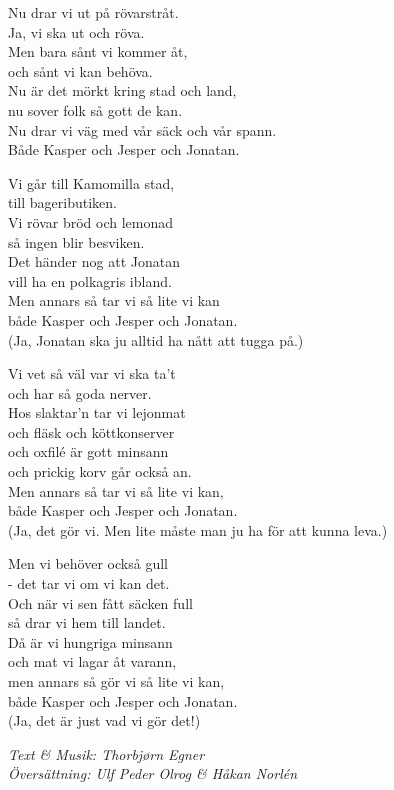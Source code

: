 \vspace{10pt}
Nu drar vi ut på rövarstråt.\\
Ja, vi ska ut och röva.\\
Men bara sånt vi kommer åt,\\
och sånt vi kan behöva.\\
Nu är det mörkt kring stad och land,\\
nu sover folk så gott de kan.\\
Nu drar vi väg med vår säck och vår spann.\\
Både Kasper och Jesper och Jonatan.\par
\vspace{10pt}
Vi går till Kamomilla stad,\\
till bageributiken.\\
Vi rövar bröd och lemonad\\
så ingen blir besviken.\\
Det händer nog att Jonatan\\
vill ha en polkagris ibland.\\
Men annars så tar vi så lite vi kan\\
både Kasper och Jesper och Jonatan.\\
{\footnotesize(Ja, Jonatan ska ju alltid ha nått att tugga på.)}\par
\vspace{10pt}
Vi vet så väl var vi ska ta't\\
och har så goda nerver.\\
Hos slaktar'n tar vi lejonmat\\
och fläsk och köttkonserver\\
och oxfilé är gott minsann\\
och prickig korv går också an.\\
Men annars så tar vi så lite vi kan,\\
både Kasper och Jesper och Jonatan.\\
{\footnotesize(Ja, det gör vi. Men lite måste man ju ha för att kunna leva.)}\par
\vspace{10pt}
Men vi behöver också gull\\
- det tar vi om vi kan det.\\
Och när vi sen fått säcken full\\
så drar vi hem till landet.\\
Då är vi hungriga minsann\\
och mat vi lagar åt varann,\\
men annars så gör vi så lite vi kan,\\
både Kasper och Jesper och Jonatan.\\
{\footnotesize(Ja, det är just vad vi gör det!)}
\par
\vspace{10pt}
{\footnotesize\textit{Text \& Musik: Thorbjørn Egner\\Översättning: Ulf Peder Olrog \& Håkan Norlén}}
